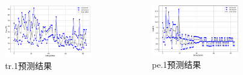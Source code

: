 \begin{frame}
\begin{columns}[T,onlytextwidth]
\begin{column}{0.3\textwidth}
\begin{minipage}{\textwidth}
\begin{figure}
        \end{figure}
    \end{minipage}
\end{column}
\begin{column}{0.3\textwidth}
    \begin{minipage}{\textwidth}
        \begin{figure}
        \centering
        \includegraphics[width=\textwidth]{figures/fig11_b_tr_predict.png}
        \caption{tr.1预测结果}
        \label{fig:fig11_b}
        \end{figure}
    \end{minipage}
\end{column}
\begin{column}{0.3\textwidth}
    \begin{minipage}{\textwidth}
        \begin{figure}
        \centering
        \includegraphics[width=\textwidth]{figures/fig11_c_pe_predict.png}
        \caption{pe.1预测结果}
        \label{fig:fig11_c}
        \end{figure}
    \end{minipage}
\end{column}
\end{columns}
\end{frame}


